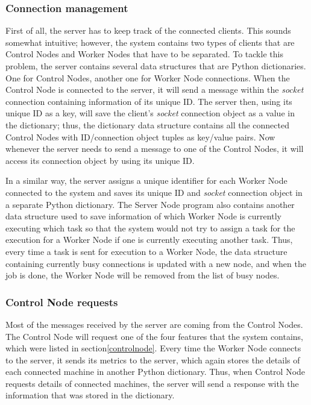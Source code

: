 \documentclass[10pt]{report}
\begin{document}
\subsubsection{Connection management}

First of all, the server has to keep track of the connected clients. This sounds somewhat intuitive; however, the system contains two types of clients that are Control Nodes and Worker Nodes that have to be separated. To tackle this problem, the server contains several data structures that are Python dictionaries. One for Control Nodes, another one for Worker Node connections. When the Control Node is connected to the server, it will send a message within the \textit{socket} connection containing information of its unique ID. The server then, using its unique ID as a key, will save the client's \textit{socket} connection object as a value in the dictionary; thus, the dictionary data structure contains all the connected Control Nodes with ID/connection object tuples as key/value pairs. Now whenever the server needs to send a message to one of the Control Nodes, it will access its connection object by using its unique ID.
\newline

In a similar way, the server assigns a unique identifier for each Worker Node connected to the system and saves its unique ID and \textit{socket} connection object in a separate Python dictionary. The Server Node program also contains another data structure used to save information of which Worker Node is currently executing which task so that the system would not try to assign a task for the execution for a Worker Node if one is currently executing another task. Thus, every time a task is sent for execution to a Worker Node, the data structure containing currently busy connections is updated with a new node, and when the job is done, the Worker Node will be removed from the list of busy nodes.

\subsubsection{Control Node requests}

Most of the messages received by the server are coming from the Control Nodes. The Control Node will request one of the four features that the system contains, which were listed in section\ref{controlnode}. Every time the Worker Node connects to the server, it sends its metrics to the server, which again stores the details of each connected machine in another Python dictionary. Thus, when Control Node requests details of connected machines, the server will send a response with the information that was stored in the dictionary.
\newline
\end{document}
